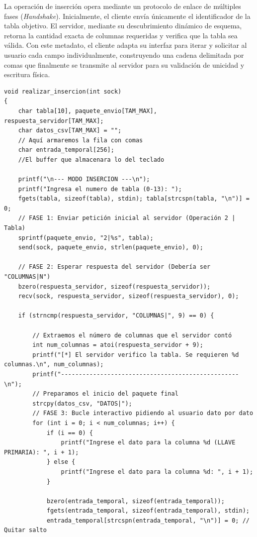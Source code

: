 \documentclass[12pt]{article}
\begin{document}
La operación de inserción opera mediante un protocolo de enlace de múltiples fases (\textit{Handshake}). Inicialmente, el cliente envía únicamente el identificador de la tabla objetivo. El servidor, mediante su descubrimiento dinámico de esquema, retorna la cantidad exacta de columnas requeridas y verifica que la tabla sea válida. Con este metadato, el cliente adapta su interfaz para iterar y solicitar al usuario cada campo individualmente, construyendo una cadena delimitada por comas que finalmente se transmite al servidor para su validación de unicidad y escritura física.

\begin{lstlisting}[style=estiloC ,title={Código 3. Cliente TCP (INSERCION)}]
void realizar_insercion(int sock)
{
    char tabla[10], paquete_envio[TAM_MAX], respuesta_servidor[TAM_MAX];
    char datos_csv[TAM_MAX] = "";
    // Aquí armaremos la fila con comas
    char entrada_temporal[256];
    //El buffer que almacenara lo del teclado

    printf("\n--- MODO INSERCION ---\n");
    printf("Ingresa el numero de tabla (0-13): ");
    fgets(tabla, sizeof(tabla), stdin); tabla[strcspn(tabla, "\n")] = 0;
    // FASE 1: Enviar petición inicial al servidor (Operación 2 | Tabla)
    sprintf(paquete_envio, "2|%s", tabla);
    send(sock, paquete_envio, strlen(paquete_envio), 0);

    // FASE 2: Esperar respuesta del servidor (Debería ser "COLUMNAS|N")
    bzero(respuesta_servidor, sizeof(respuesta_servidor));
    recv(sock, respuesta_servidor, sizeof(respuesta_servidor), 0);

    if (strncmp(respuesta_servidor, "COLUMNAS|", 9) == 0) {
        
        // Extraemos el número de columnas que el servidor contó
        int num_columnas = atoi(respuesta_servidor + 9);
        printf("[*] El servidor verifico la tabla. Se requieren %d columnas.\n", num_columnas);
        printf("--------------------------------------------------\n");
        // Preparamos el inicio del paquete final
        strcpy(datos_csv, "DATOS|");
        // FASE 3: Bucle interactivo pidiendo al usuario dato por dato
        for (int i = 0; i < num_columnas; i++) {
            if (i == 0) {
                printf("Ingrese el dato para la columna %d (LLAVE PRIMARIA): ", i + 1);
            } else {
                printf("Ingrese el dato para la columna %d: ", i + 1);
            }
            
            bzero(entrada_temporal, sizeof(entrada_temporal));
            fgets(entrada_temporal, sizeof(entrada_temporal), stdin);
            entrada_temporal[strcspn(entrada_temporal, "\n")] = 0; // Quitar salto


\end{lstlisting}
\end{document}
